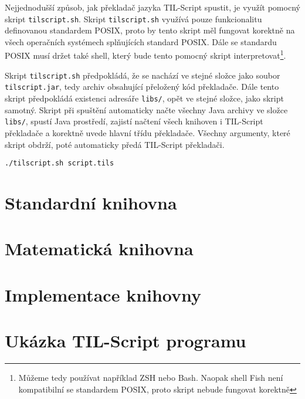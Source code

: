 Nejjednodušší způsob, jak překladač jazyka TIL-Script spustit, je využít pomocný skript
\lstinline{tilscript.sh}. Skript \lstinline{tilscript.sh} využívá pouze funkcionalitu definovanou
standardem POSIX, proto by tento skript měl fungovat korektně na všech operačních systémech
splňujících standard POSIX. Dále se standardu POSIX musí držet také shell, který bude tento pomocný
skript interpretovat\footnote{Můžeme tedy používat například ZSH nebo Bash. Naopak shell Fish není
kompatibilní se standardem POSIX, proto skript nebude fungovat korektně}.

Skript \lstinline{tilscript.sh} předpokládá, že se nachází ve stejné složce jako soubor
\lstinline{tilscript.jar}, tedy archiv obsahující přeložený kód překladače. Dále tento skript
předpokládá existenci adresáře \lstinline{libs/}, opět ve stejné složce, jako skript samotný.
Skript při spuštění automaticky načte všechny Java archivy ve složce \lstinline{libs/}, spustí
Java prostředí, zajistí načtení všech knihoven i TIL-Script překladače a korektně uvede hlavní
třídu překladače. Všechny argumenty, které skript obdrží, poté automaticky předá TIL-Script
překladači.

\begin{lstlisting}[caption={Spuštění překladače za využití pomocného skriptu}]
./tilscript.sh script.tils
\end{lstlisting}

\section{Standardní knihovna}

\section{Matematická knihovna}

\section{Implementace knihovny}

\section{Ukázka TIL-Script programu}

\endinput
